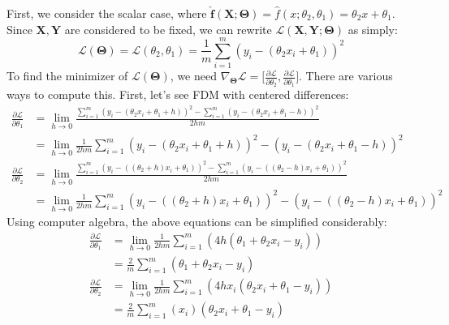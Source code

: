 \documentclass[12pt,initial,twoside,maitrise]{dms}
\numberwithin{equation}{section}
\numberwithin{table}{chapter}
\numberwithin{figure}{chapter}
\begin{document}
First, we consider the scalar case, where $\mathbf{\hat f}(\mathbf{X}; \mathbf{\Theta}) = \hat f(x; \theta_2, \theta_1) = \theta_2 x + \theta_1$. Since $\mathbf{X}, \mathbf{Y}$ are considered to be fixed, we can rewrite $\mathcal{L}(\mathbf{X}, \mathbf{Y}; \mathbf{\Theta})$ as simply:
%
\begin{equation}
\mathcal{L}(\mathbf{\Theta}) = \mathcal{L}(\theta_2, \theta_1) = \frac{1}{m}\sum_{i=1}^m(y_i - (\theta_2 x_i + \theta_1))^2
\end{equation}
%
To find the minimizer of $\mathcal{L}(\mathbf{\Theta})$, we need $\nabla_\mathbf{\Theta}\mathcal{L} = \lbrack \frac{\partial\mathcal{L}}{\partial \theta_2}, \frac{\partial\mathcal{L}}{\partial \theta_1}\rbrack$. There are various ways to compute this. First, let's see FDM with centered differences:
%
\begin{align}
\frac{\partial\mathcal{L}}{\partial \theta_1} & = \underset{h \rightarrow 0}{\operatorname{lim}} \frac{\sum_{i=1}^m\left(y_i - \left(\theta_2 x_i + \theta_1 + h\right)\right)^2 - \sum_{i=1}^m\left(y_i - \left(\theta_2 x_i + \theta_1 - h\right)\right)^2}{2hm} \\ & = \underset{h \rightarrow 0}{\operatorname{lim}} \frac{1}{2hm}\sum_{i=1}^m\left(y_i - \left(\theta_2 x_i + \theta_1 + h\right)\right)^2 - \left(y_i - \left(\theta_2 x_i + \theta_1 - h\right)\right)^2 \\
\frac{\partial\mathcal{L}}{\partial \theta_2} & = \underset{h \rightarrow 0}{\operatorname{lim}} \frac{\sum_{i=1}^m\left(y_i - \left((\theta_2 + h) x_i + \theta_1\right)\right)^2 - \sum_{i=1}^m\left(y_i - \left(\left(\theta_2 - h\right) x_i + \theta_1\right)\right)^2}{2hm} \\ & = \underset{h \rightarrow 0}{\operatorname{lim}} \frac{1}{2hm}\sum_{i=1}^m\left(y_i - \left(\left(\theta_2 + h\right) x_i + \theta_1\right)\right)^2 - \left(y_i - \left(\left(\theta_2 - h\right) x_i + \theta_1\right)\right)^2
\end{align}
%
Using computer algebra, the above equations can be simplified considerably:
%
\begin{align}
\frac{\partial\mathcal{L}}{\partial \theta_1} & = \underset{h \rightarrow 0}{\operatorname{lim}} \frac{1}{2hm}\sum_{i=1}^m\left(4h ( \theta_1 +  \theta_2 x_i - y_i)\right) \label{eq:dL_dtheta0} \\
& = \boxed{\frac{2}{m}\sum_{i=1}^m\left(\theta_1 + \theta_2 x_i - y_i\right)} \\
\frac{\partial\mathcal{L}}{\partial \theta_2} & = \underset{h \rightarrow 0}{\operatorname{lim}} \frac{1}{2hm}\sum_{i=1}^m\left(4hx_i (\theta_2 x_i + \theta_1 - y_i)\right) \label{eq:dL_dtheta1} \\
& = \boxed{\frac{2}{m}\sum_{i=1}^m(x_i)(\theta_2 x_i + \theta_1 - y_i)}
\end{align}
\end{document}
